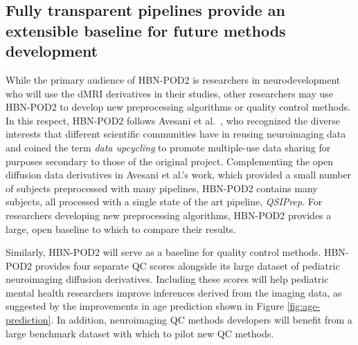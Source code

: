 \documentclass[fleqn,10pt]{wlscirep}
\begin{document}
\subsection*{Fully transparent pipelines provide an extensible baseline for future methods development}

While the primary audience of HBN-POD2 is researchers in neurodevelopment who
will use the dMRI derivatives in their studies, other researchers may use
HBN-POD2 to develop new preprocessing algorithms or quality control methods. In
this respect, HBN-POD2 follows Avesani et al.~\cite{avesani2019-ey}, who
recognized the diverse interests that different scientific communities have in
reusing neuroimaging data and coined the term \emph{data upcycling} to promote
multiple-use data sharing for purposes secondary to those of the original
project. Complementing the open diffusion data derivatives in Avesani et al.'s
work, which provided a small number of subjects preprocessed with many
pipelines, HBN-POD2 contains many subjects, all processed with a single state of
the art pipeline, \emph{QSIPrep}. For researchers developing new preprocessing
algorithms, HBN-POD2 provides a large, open baseline to which to compare their
results.

Similarly, HBN-POD2 will serve as a baseline for quality control methods.
HBN-POD2 provides four separate QC scores alongside its large dataset of
pediatric neuroimaging diffusion derivatives. Including these scores will help
pediatric mental health researchers improve inferences derived from the imaging
data, as suggested by the improvements in age prediction shown in Figure
\ref{fig:age-prediction}. In addition, neuroimaging QC methods developers will
benefit from a large benchmark dataset with which to pilot new QC methods.

\end{document}
